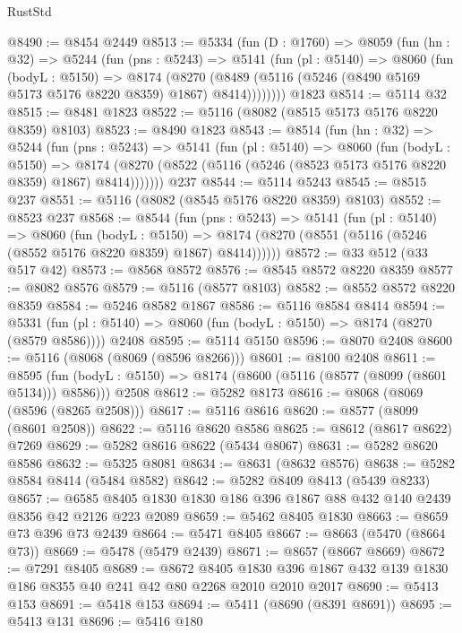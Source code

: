 \begin{lexlean}{RustStd}
\begin{coremodule}
@8490 := @8454 @2449
@8513 := @5334
    (fun (D : @1760) =>
    @8059
      (fun (hn : @32) =>
      @5244
        (fun (pns : @5243) =>
        @5141
          (fun (pl : @5140) =>
          @8060
            (fun (bodyL : @5150) =>
            @8174
              (@8270 (@8489 (@5116 (@5246 (@8490 @5169 @5173 @5176 @8220 @8359) @1867) @8414))))))))
    @1823
@8514 := @5114 @32
@8515 := @8481 @1823
@8522 := @5116 (@8082 (@8515 @5173 @5176 @8220 @8359) @8103)
@8523 := @8490 @1823
@8543 := @8514
    (fun (hn : @32) =>
    @5244
      (fun (pns : @5243) =>
      @5141
        (fun (pl : @5140) =>
        @8060
          (fun (bodyL : @5150) =>
          @8174 (@8270 (@8522 (@5116 (@5246 (@8523 @5173 @5176 @8220 @8359) @1867) @8414)))))))
    @237
@8544 := @5114 @5243
@8545 := @8515 @237
@8551 := @5116 (@8082 (@8545 @5176 @8220 @8359) @8103)
@8552 := @8523 @237
@8568 := @8544
    (fun (pns : @5243) =>
    @5141
      (fun (pl : @5140) =>
      @8060
        (fun (bodyL : @5150) =>
        @8174 (@8270 (@8551 (@5116 (@5246 (@8552 @5176 @8220 @8359) @1867) @8414))))))
@8572 := @33 @512 (@33 @517 @42)
@8573 := @8568 @8572
@8576 := @8545 @8572 @8220 @8359
@8577 := @8082 @8576
@8579 := @5116 (@8577 @8103)
@8582 := @8552 @8572 @8220 @8359
@8584 := @5246 @8582 @1867
@8586 := @5116 @8584 @8414
@8594 := @5331
    (fun (pl : @5140) => @8060 (fun (bodyL : @5150) => @8174 (@8270 (@8579 @8586))))
    @2408
@8595 := @5114 @5150
@8596 := @8070 @2408
@8600 := @5116 (@8068 (@8069 (@8596 @8266)))
@8601 := @8100 @2408
@8611 := @8595
    (fun (bodyL : @5150) => @8174 (@8600 (@5116 (@8577 (@8099 (@8601 @5134))) @8586)))
    @2508
@8612 := @5282 @8173
@8616 := @8068 (@8069 (@8596 (@8265 @2508)))
@8617 := @5116 @8616
@8620 := @8577 (@8099 (@8601 @2508))
@8622 := @5116 @8620 @8586
@8625 := @8612 (@8617 @8622) @7269
@8629 := @5282 @8616 @8622 (@5434 @8067)
@8631 := @5282 @8620 @8586
@8632 := @5325 @8081
@8634 := @8631 (@8632 @8576)
@8638 := @5282 @8584 @8414 (@5484 @8582)
@8642 := @5282 @8409 @8413 (@5439 @8233)
@8657 := @6585 @8405 @1830 @1830 @186 @396 @1867 @88 @432 @140 @2439 @8356 @42 @2126 @223 @2089
@8659 := @5462 @8405 @1830
@8663 := @8659 @73 @396 @73 @2439
@8664 := @5471 @8405
@8667 := @8663 (@5470 (@8664 @73))
@8669 := @5478 (@5479 @2439)
@8671 := @8657 (@8667 @8669)
@8672 := @7291 @8405
@8689 := @8672
    @8405
    @1830
    @396
    @1867
    @432
    @139
    @1830
    @186
    @8355
    @40
    @241
    @42
    @80
    @2268
    @2010
    @2010
    @2017
@8690 := @5413 @153
@8691 := @5418 @153
@8694 := @5411 (@8690 (@8391 @8691))
@8695 := @5413 @131
@8696 := @5416 @180

\end{coremodule}
\end{lexlean}
